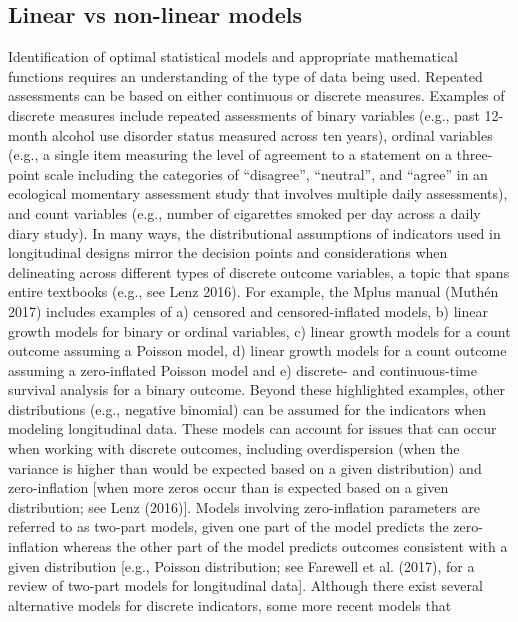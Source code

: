\documentclass[
  letterpaper,
  DIV=11,
  numbers=noendperiod]{scrartcl}
\begin{document}
\hypertarget{linear-vs-non-linear-models}{%
\subsection{Linear vs non-linear
models}\label{linear-vs-non-linear-models}}

Identification of optimal statistical models and appropriate
mathematical functions requires an understanding of the type of data
being used. Repeated assessments can be based on either continuous or
discrete measures. Examples of discrete measures include repeated
assessments of binary variables (e.g., past 12-month alcohol use
disorder status measured across ten years), ordinal variables (e.g., a
single item measuring the level of agreement to a statement on a
three-point scale including the categories of ``disagree'', ``neutral'',
and ``agree'' in an ecological momentary assessment study that involves
multiple daily assessments), and count variables (e.g., number of
cigarettes smoked per day across a daily diary study). In many ways, the
distributional assumptions of indicators used in longitudinal designs
mirror the decision points and considerations when delineating across
different types of discrete outcome variables, a topic that spans entire
textbooks (e.g., see Lenz 2016). For example, the Mplus manual (Muthén
2017) includes examples of a) censored and censored-inflated models, b)
linear growth models for binary or ordinal variables, c) linear growth
models for a count outcome assuming a Poisson model, d) linear growth
models for a count outcome assuming a zero-inflated Poisson model and e)
discrete- and continuous-time survival analysis for a binary outcome.
Beyond these highlighted examples, other distributions (e.g., negative
binomial) can be assumed for the indicators when modeling longitudinal
data. These models can account for issues that can occur when working
with discrete outcomes, including overdispersion (when the variance is
higher than would be expected based on a given distribution) and
zero-inflation {[}when more zeros occur than is expected based on a
given distribution; see Lenz (2016){]}. Models involving zero-inflation
parameters are referred to as two-part models, given one part of the
model predicts the zero-inflation whereas the other part of the model
predicts outcomes consistent with a given distribution {[}e.g., Poisson
distribution; see Farewell et al. (2017), for a review of two-part
models for longitudinal data{]}. Although there exist several
alternative models for discrete indicators, some more recent models that
\end{document}
